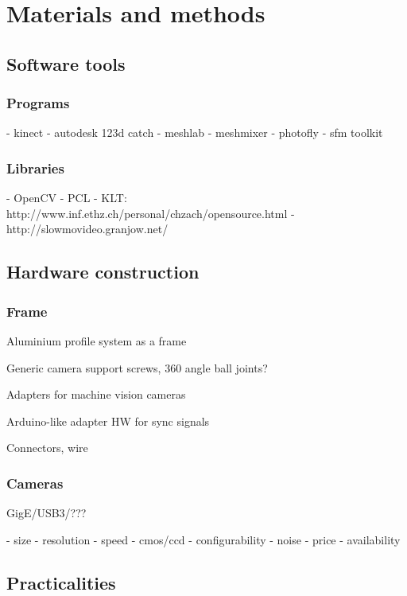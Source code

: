 \section{Materials and methods}

\subsection{Software tools}

\subsubsection{Programs}

- kinect
- autodesk 123d catch
- meshlab
- meshmixer
- photofly
- sfm toolkit

\subsubsection{Libraries}

- OpenCV
- PCL
- KLT: http://www.inf.ethz.ch/personal/chzach/opensource.html
- http://slowmovideo.granjow.net/


\subsection{Hardware construction}

\subsubsection{Frame}

Aluminium profile system as a frame

Generic camera support screws, 360 angle ball joints?

Adapters for machine vision cameras

Arduino-like adapter HW for sync signals

Connectors, wire

\subsubsection{Cameras}

GigE/USB3/???

- size
- resolution
- speed
- cmos/ccd
- configurability
- noise
- price
- availability

\subsection{Practicalities}

